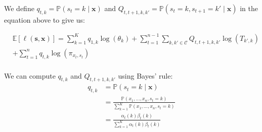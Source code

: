 \documentclass[10pt,landscape]{article}
\newcommand{\p}{\mathbb{P}}
\newcommand{\E}{\mathbb{E}}
\begin{document}
\begin{multicols*}{3}
	We define $q_{t, k} = \p(s_{t} = k \mid \mathbf{x})$ and $Q_{t, t + 1, k, k'} = \p(s_{t} = k, s_{t + 1} = k' \mid \mathbf{x})$ in the equation above to give us:

	\begin{equation}\label{eq:HMMEM}\begin{aligned}
			 & \E[\ell(\mathbf{s}, \mathbf{x})]                                                                                                                                                   = \sum_{k = 1}^{K} q_{1, k} \log(\theta_{k}) + \sum_{t = 1}^{n - 1} \sum_{k, k' \in \mathcal{C}} Q_{t, t+1, k, k'} \log(T_{k', k}) \\
			 & + \sum_{t = 1}^{n} q_{t, k} \log(\pi_{x_{t}, s_{t}})                                                                                                                                                                                                                                                                  \\
		\end{aligned}\end{equation}

	We can compute $q_{t, k}$ and $Q_{t, t + 1, k, k'}$ using Bayes' rule:
	\begin{equation*}\begin{aligned}
			q_{t, k} & = \p(s_{t} = k \mid \mathbf{x})                                                                  \\
			         & = \frac{\p(x_{1}, \dots, x_{n}, s_{t} = k)}{\sum_{k = 1}^{K} \p(x_{1}, \dots, x_{n}, s_{t} = k)} \\
			         & = \frac{\alpha_{t}(k)\beta_{t}(k)}{\sum_{k = 1}^{K} \alpha_{t}(k)\beta_{t}(k)}
		\end{aligned}\end{equation*}


\end{multicols*}
\end{document}
